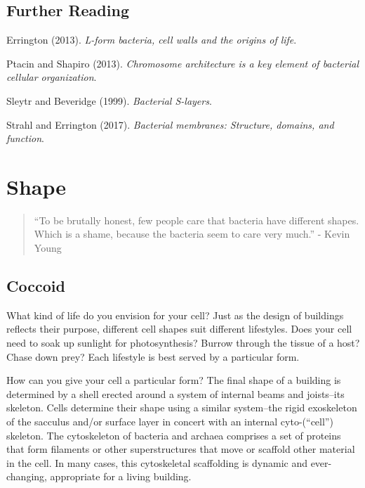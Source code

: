 \documentclass[]{tufte-book}
\begin{document}
\section{Further Reading}\label{further-reading-1}

Errington (2013). \emph{L-form bacteria, cell walls and the origins of
life}.\citep{errington2013}

Ptacin and Shapiro (2013). \emph{Chromosome architecture is a key
element of bacterial cellular organization}.\citep{ptacin2013}

Sleytr and Beveridge (1999). \emph{Bacterial
S-layers}.\citep{sleytr1999}

Strahl and Errington (2017). \emph{Bacterial membranes: Structure,
domains, and function}.\citep{strahl2017}

\chapter{Shape}\label{shape}

\begin{quote}
``To be brutally honest, few people care that bacteria have different
shapes. Which is a shame, because the bacteria seem to care very much.''
- Kevin Young \citep{young2006}
\end{quote}

\section{Coccoid}\label{coccoid}

What kind of life do you envision for your cell? Just as the design of
buildings reflects their purpose, different cell shapes suit different
lifestyles. Does your cell need to soak up sunlight for photosynthesis?
Burrow through the tissue of a host? Chase down prey? Each lifestyle is
best served by a particular form.

How can you give your cell a particular form? The final shape of a
building is determined by a shell erected around a system of internal
beams and joists--its skeleton. Cells determine their shape using a
similar system--the rigid exoskeleton of the sacculus and/or surface
layer in concert with an internal cyto-(``cell'') skeleton. The
cytoskeleton of bacteria and archaea comprises a set of proteins that
form filaments or other superstructures that move or scaffold other
material in the cell. In many cases, this cytoskeletal scaffolding is
dynamic and ever-changing, appropriate for a living building.
\end{document}
